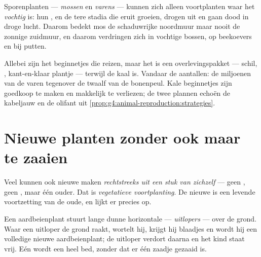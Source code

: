 \begin{proposition}\label{prop:g4:plants-without-seeds:damp}
Sporenplanten --- \emph{mossen} en \emph{varens}
--- kunnen zich alleen voortplanten waar het \emph{vochtig} is: hun
, en de tere stadia die eruit groeien, drogen uit en gaan dood in
droge lucht. Daarom bedekt mos de schaduwrijke noordmuur maar nooit de
zonnige zuidmuur, en daarom verdringen  zich in vochtige bossen,
op beekoevers en bij putten.
\end{proposition}
\admitted

\begin{remark}\label{rem:g4:plants-without-seeds:sporeseed}
Allebei zijn het beginnetjes die reizen, maar het  is een
overlevingspakket --- schil, , kant-en-klaar plantje ---
terwijl de  kaal is. Vandaar de aantallen: de miljoenen  van
de varen tegenover de twaalf  van de bonenpeul. Kale beginnetjes
zijn goedkoop te maken en makkelijk te verliezen; de twee plannen echoën
de kabeljauw en de olifant uit
\cref{prop:g4:animal-reproduction:strategies}.
\end{remark}

\section{Nieuwe planten zonder ook maar te zaaien}

\begin{definition}\label{def:g4:plants-without-seeds:vegetative}
Veel  kunnen ook nieuwe  maken \emph{rechtstreeks uit een
stuk van zichzelf} --- geen , geen , maar één ouder. Dat is
\emph{vegetatieve voortplanting}. De
nieuwe  is een levende voortzetting van de oude, en lijkt er
precies op.
\end{definition}

\begin{example}\label{ex:g4:plants-without-seeds:runner}
Een aardbeienplant stuurt lange dunne horizontale  ---
\emph{uitlopers} --- over de grond. Waar een uitloper
de grond raakt, wortelt hij, krijgt hij blaadjes en wordt hij een
volledige nieuwe aardbeienplant; de uitloper verdort daarna en het kind
staat vrij. Eén  wordt een heel bed, zonder dat er één zaadje
gezaaid is.
\end{example}

